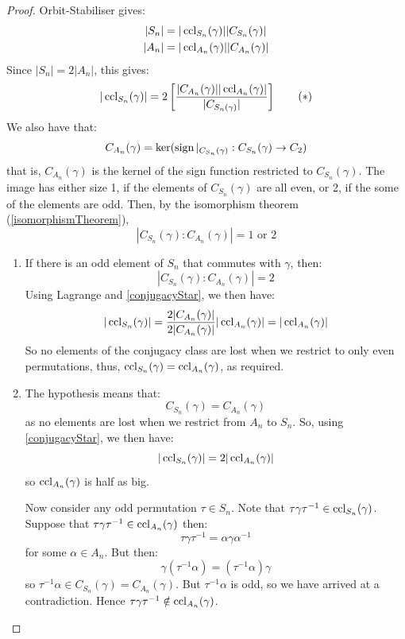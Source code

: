 \documentclass[../main.tex]{subfiles}
\begin{document}
\begin{proof}
  Orbit-Stabiliser gives:
  \begin{align*}
    |S_n| &= |\operatorname{ccl}_{S_n}(\gamma)||C_{S_n}(\gamma)| \\
    |A_n| &= |\operatorname{ccl}_{A_n}(\gamma)||C_{A_n}(\gamma)|
  \end{align*}
  Since $|S_n| = 2|A_n|$, this gives:
  \begin{equation}
    \label{conjugacyStar}
    |\operatorname{ccl}_{S_n}(\gamma)| = 2 \left[\frac{|C_{A_n}(\gamma)||\operatorname{ccl}_{A_n}(\gamma)|}{|C_{S_n(\gamma)}|}\right] \tag{\textasteriskcentered}
  \end{equation}
  We also have that:
  \[
    C_{A_n}(\gamma) = \ker(\operatorname{sign} |_{C_{S_n}(\gamma)}: C_{S_n}(\gamma) \to C_2)
  \]
  that is, $C_{A_n}(\gamma)$ is the kernel of the sign function restricted to $C_{S_n}(\gamma)$.
  The image has either size 1, if the elements of $C_{S_n}(\gamma)$ are all even, or 2, if the some of the elements are odd.
  Then, by the isomorphism theorem (\cref{isomorphismTheorem}),
  \[
    |C_{S_n}(\gamma) : C_{A_n}(\gamma)| = 1 \text{ or }2
  \]
  \begin{enumerate}
    \item If there is an odd element of $S_n$ that commutes with $\gamma$, then:
      \[
        |C_{S_n}(\gamma) : C_{A_n}(\gamma)| = 2
      \]
      Using Lagrange and \cref{conjugacyStar}, we then have:
      \[
        |\operatorname{ccl}_{S_n}(\gamma)| = \frac{2|C_{A_n}(\gamma)|}{2|C_{A_n}(\gamma)|}|\operatorname{ccl}_{A_n}(\gamma)| = |\operatorname{ccl}_{A_n}(\gamma)|
      \]
      So no elements of the conjugacy class are lost when we restrict to only even permutations, thus, $\operatorname{ccl}_{S_n}(\gamma) = \operatorname{ccl}_{A_n}(\gamma)$, as required.
    \item The hypothesis means that:
      \[
        C_{S_n}(\gamma) = C_{A_n}(\gamma)
      \]
      as no elements are lost when we restrict from $A_n$ to $S_n$.
      So, using \cref{conjugacyStar}, we then have:
      \[
        |\operatorname{ccl}_{S_n}(\gamma)| = 2 |\operatorname{ccl}_{A_n}(\gamma)|
      \]
      so $\operatorname{ccl}_{A_n}(\gamma)$ is half as big.

      Now consider any odd permutation $\tau \in S_n$.
      Note that $\tau \gamma \tau^{-1} \in \operatorname{ccl}_{S_n}(\gamma)$.
      Suppose that $\tau \gamma \tau^{-1} \in \operatorname{ccl}_{A_n}(\gamma)$ then:
      \[
        \tau\gamma\tau^{-1} = \alpha \gamma \alpha^{-1}
      \]
      for some $\alpha \in A_n$.
      But then:
      \[
        \gamma (\tau^{-1} \alpha) = (\tau^{-1} \alpha) \gamma
      \]
      so $\tau^{-1} \alpha \in C_{S_n}(\gamma) = C_{A_n}(\gamma)$.
      But $\tau^{-1} \alpha$ is odd, so we have arrived at a contradiction.
      Hence $\tau \gamma \tau^{-1} \notin \operatorname{ccl}_{A_n}(\gamma)$.


\end{enumerate}
\end{proof}
\end{document}
